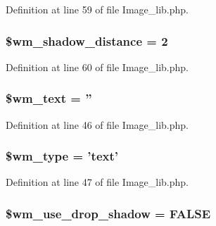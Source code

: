 Definition at line 59 of file Image\-\_\-lib.\-php.

\hypertarget{class_c_i___image__lib_a3d5174ca66ce7149799b5830873aa747}{
\subsubsection[{\$wm\-\_\-shadow\-\_\-distance}]{\setlength{\rightskip}{0pt plus 5cm}\$wm\-\_\-shadow\-\_\-distance = 2}}\label{class_c_i___image__lib_a3d5174ca66ce7149799b5830873aa747}


Definition at line 60 of file Image\-\_\-lib.\-php.

\hypertarget{class_c_i___image__lib_a412eac22e8d585a33f28f132f13d482b}{
\subsubsection[{\$wm\-\_\-text}]{\setlength{\rightskip}{0pt plus 5cm}\$wm\-\_\-text = ''}}\label{class_c_i___image__lib_a412eac22e8d585a33f28f132f13d482b}


Definition at line 46 of file Image\-\_\-lib.\-php.

\hypertarget{class_c_i___image__lib_a530808b613890909a92bf6096401e9be}{
\subsubsection[{\$wm\-\_\-type}]{\setlength{\rightskip}{0pt plus 5cm}\$wm\-\_\-type = '{\bf text}'}}\label{class_c_i___image__lib_a530808b613890909a92bf6096401e9be}


Definition at line 47 of file Image\-\_\-lib.\-php.

\hypertarget{class_c_i___image__lib_a49b77ed476cebe5f357705e7a9c4ccce}{
\subsubsection[{\$wm\-\_\-use\-\_\-drop\-\_\-shadow}]{\setlength{\rightskip}{0pt plus 5cm}\$wm\-\_\-use\-\_\-drop\-\_\-shadow = F\-A\-L\-S\-E}}\label{class_c_i___image__lib_a49b77ed476cebe5f357705e7a9c4ccce}


